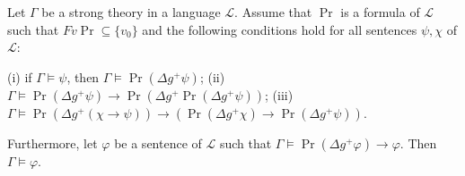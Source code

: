 Let $\Gamma$ be a strong theory in a language $\mathcal{L}$. Assume that $\Pr$ is a formula of $\mathcal{L}$ such that $Fv \Pr \subseteq \{v_0\}$ and the following conditions hold for all sentences $\psi, \chi$ of $\mathcal{L}$:

(i) if $\Gamma \models \psi$, then $\Gamma \models \Pr(\Delta g^+ \psi)$;
(ii) $\Gamma \models \Pr(\Delta g^+ \psi) \rightarrow \Pr(\Delta g^+ \Pr(\Delta g^+ \psi))$;
(iii) $\Gamma \models \Pr(\Delta g^+ (\chi \rightarrow \psi)) \rightarrow (\Pr(\Delta g^+ \chi) \rightarrow \Pr(\Delta g^+ \psi))$.

Furthermore, let $\varphi$ be a sentence of $\mathcal{L}$ such that $\Gamma \models \Pr(\Delta g^+ \varphi) \rightarrow \varphi$. Then $\Gamma \models \varphi$.
